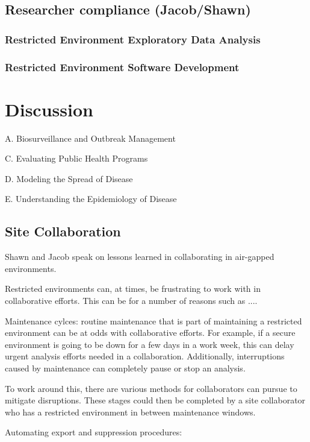 \documentclass{amia}
\begin{document}
\subsection{Researcher compliance (Jacob/Shawn)}
        
\subsubsection{Restricted Environment Exploratory Data Analysis}

\subsubsection{Restricted Environment Software Development }

\section*{Discussion}

A. Biosurveillance and Outbreak Management 

C. Evaluating Public Health Programs 

D. Modeling the Spread of Disease 

E. Understanding the Epidemiology of Disease 

\subsection*{Site Collaboration}

Shawn and Jacob speak on lessons learned in collaborating in air-gapped environments. 

Restricted environments can, at times, be frustrating to work with in collaborative efforts. This can be for a number of reasons such as ....

Maintenance cylces: routine maintenance that is part of maintaining a restricted environment can be at odds with collaborative efforts. For example, if a secure environment is going to be down for a few days in a work week, this can delay urgent analysis efforts needed in a collaboration. Additionally, interruptions caused by maintenance can completely pause or stop an analysis. 

To work around this, there are various methods for collaborators can pursue to mitigate disruptions. These stages could then be completed by a site collaborator who has a restricted environment in between maintenance windows. 

Automating export and suppression procedures:
\end{document}

